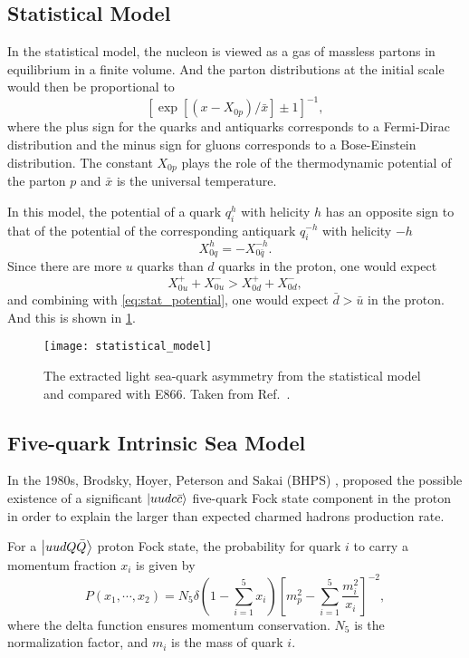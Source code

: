 \documentclass[../main.tex]{subfiles}
\begin{document}
\subsection{Statistical Model}
In the statistical model\cite{bourrely2015}, the nucleon is viewed as a gas of massless partons in equilibrium in
a finite volume. And the parton distributions at the initial scale would then be proportional to
\begin{equation}
	\left[ \exp\left[\left(x-X_{0p}\right)/\bar{x}\right] \pm 1 \right]^{-1},
\end{equation}
where the plus sign for the quarks and antiquarks corresponds to a Fermi-Dirac distribution and
the minus sign for gluons corresponds to a Bose-Einstein distribution. The constant $X_{0p}$
plays the role of the thermodynamic potential of the parton $p$ and $\bar{x}$ is the universal
temperature.

In this model, the potential of a quark $q_i^h$ with helicity $h$ has an opposite sign to that of the
potential of the corresponding antiquark $q_i^{-h}$ with helicity $-h$
\begin{equation}
	X_{0q}^h = -X_{0\bar{q}}^{-h}.
	\label{eq:stat_potential}
\end{equation}
Since there are more $u$ quarks than $d$ quarks in the proton, one would expect
\begin{equation}
	X_{0u}^+ + X_{0u}^- > X_{0d}^+ + X_{0d}^-,
\end{equation}
and combining with \cref{eq:stat_potential}, one would expect $\bar{d} > \bar{u}$ in the proton.
And this is shown in \cref{fig:stat_dbub}.
\begin{figure}
	\centering
	\texttt{[image: statistical\_model]}
	\caption{The extracted light sea-quark asymmetry from the statistical model and compared with E866. Taken
		from Ref.~\cite{soffer2019}.}
	\label{fig:stat_dbub}
\end{figure}


\subsection{Five-quark Intrinsic Sea Model}
In the 1980s, Brodsky, Hoyer, Peterson and Sakai (BHPS) \cite{brodsky1980}, proposed
the possible existence of a significant $\ket{uudc\bar{c}}$ five-quark Fock state component
in the proton in order to explain the larger than expected charmed hadrons production rate.

For a $\ket{uudQ\bar{Q}}$ proton Fock state, the probability for quark $i$ to carry a momentum
fraction $x_i$ is given by
\begin{equation}
	P\left(x_1,\cdots,x_2\right)=N_5 \delta\left(1-\sum^5_{i=1}x_i\right)\left[m_p^2-\sum^5_{i=1}\frac{m_i^2}{x_i}\right]^{-2},
\end{equation}
where the delta function ensures momentum conservation. $N_5$ is the normalization factor,
and $m_i$ is the mass of quark $i$.
\end{document}
